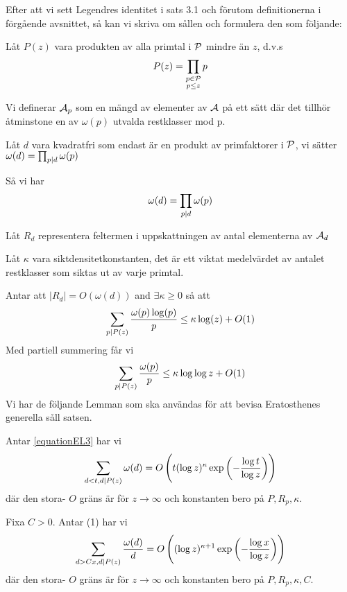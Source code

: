 Efter att vi sett Legendres identitet i sats 3.1 och förutom definitionerna i förgående avsnittet, så kan vi skriva om sållen och formulera den som följande:


Låt $ P(z) $ vara produkten av alla primtal i $ \P $ mindre än $ z $, d.v.s
\[P(z)=\prod_{\substack{p \in \P\\ p \leq z}} p \]

Vi definerar $\A_{p}$ som en mängd av elementer av $ \A $ på ett sätt där det tillhör åtminstone en av $\omega(p)$ utvalda restklasser mod p.

Låt $ d $ vara kvadratfri som endast är en produkt av primfaktorer i $ \P $, vi sätter $\omega(d)=\prod_{p \divides d} \omega(p)$

Så vi har
\[\omega(d)=\prod_{p\divides d}\omega(p)\]

Låt $ R_{d} $ representera feltermen i uppskattningen av antal elementerna av $ \A_{d} $ 


Låt $ \kappa $ vara siktdensitetkonstanten, det är ett viktat medelvärdet av antalet restklasser som siktas ut av varje primtal.


Antar att $ \vert R_{d}\vert=O(\omega(d))$ and $ \exists\kappa\geq 0 $ så att
\begin{equation}
\label{equationEL3}
\sum_{p\divides P(z)}\frac{\omega(p)\log(p)}{p}\leq \kappa \log(z)+O(1)
\end{equation}  
Med partiell summering får vi
\[\sum_{p\divides P(z)}\frac{\omega(p)}{p}\leq\kappa\log\log z+O(1)\]
   Vi har de följande Lemman som ska användas för att bevisa Eratosthenes generella såll satsen.
\begin{lemma}
     Antar \ref{equationEL3} har vi
$$
\sum_{d<t, d \divides P(z)} \omega(d)=O\left(t(\log z)^{\kappa} \exp \left(-\frac{\log t}{\log z}\right)\right)
$$
där den stora- $O$ gräns är för $z \rightarrow \infty$ och konstanten bero på $P, R_{p}, \kappa$.
\end{lemma}
\begin{lemma}
    Fixa $C>0 .$ Antar (1) har vi
$$
\sum_{d>C x, d \divides P(z)} \frac{\omega(d)}{d}=O\left((\log z)^{\kappa+1} \exp \left(-\frac{\log x}{\log z}\right)\right)
$$
där den stora- $O$ gräns är för $z \rightarrow \infty$ och konstanten bero på $P, R_{p}, \kappa, C .$
 
\end{lemma}


